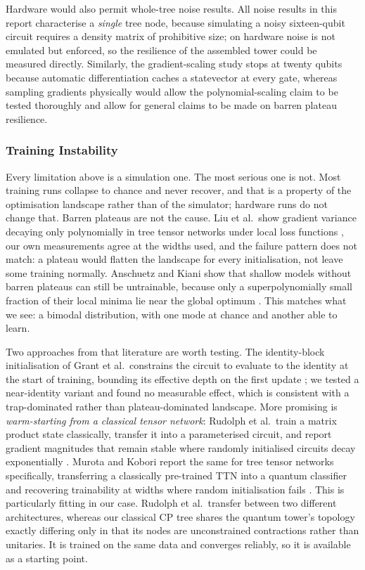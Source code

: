 \documentclass[12pt, a4paper, oneside]{report}
\begin{document}
Hardware would also permit whole-tree noise results. All noise results in this report characterise a \emph{single} tree node, because simulating a noisy sixteen-qubit circuit requires a density matrix of prohibitive size; on hardware noise is not emulated but enforced, so the resilience of the assembled tower could be measured directly. Similarly, the gradient-scaling study stops at twenty qubits because automatic differentiation caches a statevector at every gate, whereas sampling gradients physically would allow the polynomial-scaling claim to be tested thoroughly and allow for general claims to be made on barren plateau resilience.

\subsubsection{Training Instability}
Every limitation above is a simulation one. The most serious one is not. Most training runs collapse to chance and never recover, and that is a property of the optimisation landscape rather than of the simulator; hardware runs do not change that. Barren plateaus are not the cause. Liu et al.\ show gradient variance decaying only polynomially in tree tensor networks under local loss functions \cite{liu2022tnbp}, our own measurements agree at the widths used, and the failure pattern does not match: a plateau would flatten the landscape for every initialisation, not leave some training normally. Anschuetz and Kiani show that shallow models without barren plateaus can still be untrainable, because only a superpolynomially small fraction of their local minima lie near the global optimum \cite{anschuetz2022traps}. This matches what we see: a bimodal distribution, with one mode at chance and another able to learn.

Two approaches from that literature are worth testing. The identity-block initialisation of Grant et al.\ constrains the circuit to evaluate to the identity at the start of training, bounding its effective depth on the first update \cite{grant2019init}; we tested a near-identity variant and found no measurable effect, which is consistent with a trap-dominated rather than plateau-dominated landscape. More promising is \emph{warm-starting from a classical tensor network}: Rudolph et al.\ train a matrix product state classically, transfer it into a parameterised circuit, and report gradient magnitudes that remain stable where randomly initialised circuits decay exponentially \cite{rudolph2023pretraining}. Murota and Kobori report the same for tree tensor networks specifically, transferring a classically pre-trained TTN into a quantum classifier and recovering trainability at widths where random initialisation fails \cite{murota2025ttn}. This is particularly fitting in our case. Rudolph et al.\ transfer between two different architectures, whereas our classical CP tree shares the quantum tower's topology exactly differing only in that its nodes are unconstrained contractions rather than unitaries. It is trained on the same data and converges reliably, so it is available as a starting point.
\end{document}
